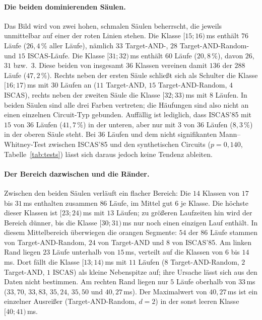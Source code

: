 \documentclass[a4paper,12pt]{article}
\theoremstyle{definition}
\begin{document}
\paragraph{Die beiden dominierenden Säulen.} Das Bild wird von zwei hohen, schmalen Säulen beherrscht, die jeweils unmittelbar auf einer der roten Linien stehen. Die Klasse $[15;16)$\,ms enthält $76$ Läufe ($26{,}4\,\%$ aller Läufe), nämlich $33$ Target-AND-, $28$ Target-AND-Random- und $15$ ISCAS-Läufe. Die Klasse $[31;32)$\,ms enthält $60$ Läufe ($20{,}8\,\%$), davon $26$, $31$ bzw.\ $3$. Diese beiden von insgesamt $36$ Klassen vereinen damit $136$ der $288$ Läufe ($47{,}2\,\%$). Rechts neben der ersten Säule schließt sich als Schulter die Klasse $[16;17)$\,ms mit $30$ Läufen an ($11$ Target-AND, $15$ Target-AND-Random, $4$ ISCAS), rechts neben der zweiten Säule die Klasse $[32;33)$\,ms mit $8$ Läufen. In beiden Säulen sind alle drei Farben vertreten; die Häufungen sind also nicht an einen einzelnen Circuit-Typ gebunden. Auffällig ist lediglich, dass ISCAS'85 mit $15$ von $36$ Läufen ($41{,}7\,\%$) in der unteren, aber nur mit $3$ von $36$ Läufen ($8{,}3\,\%$) in der oberen Säule steht. Bei $36$ Läufen und dem nicht signifikanten Mann--Whitney-Test zwischen ISCAS'85 und den synthetischen Circuits ($p = 0{,}140$, Tabelle~\ref{tab:tests}) lässt sich daraus jedoch keine Tendenz ableiten.

\paragraph{Der Bereich dazwischen und die Ränder.} Zwischen den beiden Säulen verläuft ein flacher Bereich: Die $14$ Klassen von $17$ bis $31$\,ms enthalten zusammen $86$ Läufe, im Mittel gut $6$ je Klasse. Die höchste dieser Klassen ist $[23;24)$\,ms mit $13$ Läufen; zu größeren Laufzeiten hin wird der Bereich dünner, bis die Klasse $[30;31)$\,ms nur noch einen einzigen Lauf enthält. In diesem Mittelbereich überwiegen die orangen Segmente: $54$ der $86$ Läufe stammen von Target-AND-Random, $24$ von Target-AND und $8$ von ISCAS'85. Am linken Rand liegen $23$ Läufe unterhalb von $15$\,ms, verteilt auf die Klassen von $6$ bis $14$\,ms. Dort fällt die Klasse $[13;14)$\,ms mit $11$ Läufen ($8$ Target-AND-Random, $2$ Target-AND, $1$ ISCAS) als kleine Nebenspitze auf; ihre Ursache lässt sich aus den Daten nicht bestimmen. Am rechten Rand liegen nur $5$ Läufe oberhalb von $33$\,ms ($33{,}70$, $33{,}83$, $35{,}24$, $35{,}50$ und $40{,}27$\,ms). Der Maximalwert von $40{,}27$\,ms ist ein einzelner Ausreißer (Target-AND-Random, $d=2$) in der sonst leeren Klasse $[40;41)$\,ms.
\end{document}
